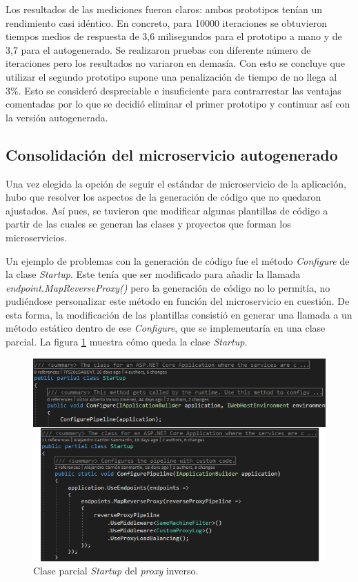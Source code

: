 \documentclass[11pt,spanish,listoffigures]{tfgetsinf}
\begin{document}
Los resultados de las mediciones fueron claros: ambos prototipos tenían un rendimiento casi idéntico.
En concreto, para 10000 iteraciones se obtuvieron tiempos medios de respuesta de 3,6 milisegundos para el prototipo a mano y de 3,7 para el autogenerado. Se realizaron pruebas con diferente número de iteraciones pero los resultados no variaron en demasía. Con esto se concluye que utilizar el segundo prototipo supone una penalización de tiempo de no llega al 3\%. Esto se consideró despreciable e insuficiente para contrarrestar las ventajas comentadas por lo que se decidió eliminar el primer prototipo y continuar así con la versión autogenerada.


		\subsection{Consolidación del microservicio autogenerado}

Una vez elegida la opción de seguir el estándar de microservicio de la aplicación, hubo que resolver los aspectos de la generación de código que no quedaron ajustados. Así pues, se tuvieron que modificar algunas plantillas de código a partir de las cuales se generan las clases y proyectos que forman los microservicios.

Un ejemplo de problemas con la generación de código fue el método \emph{Configure} de la clase \emph{Startup}. Este tenía que ser modificado para añadir la llamada \emph{endpoint.MapReverseProxy()} pero la generación de código no lo permitía, no pudiéndose personalizar este método en función del microservicio en cuestión. De esta forma, la modificación de las plantillas consistió en generar una llamada a un método estático dentro de ese \emph{Configure}, que se implementaría en una clase parcial. La figura \ref{startup} muestra cómo queda la clase \emph{Startup}.

\begin{figure}[ht]
\centering
\includegraphics[width=1\textwidth]{imagenes/startup}
\caption{Clase parcial \emph{Startup} del \emph{proxy} inverso.}
	\label{startup}
\end{figure}
\end{document}
